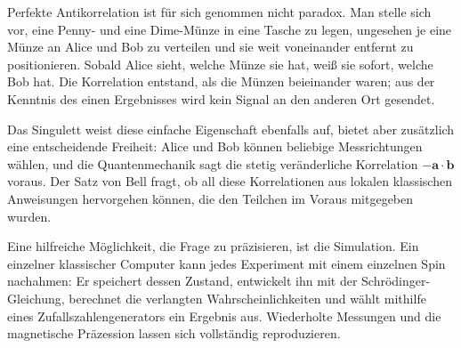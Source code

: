 Perfekte Antikorrelation ist für sich genommen nicht paradox. Man stelle sich vor, eine Penny- und eine Dime-Münze in eine Tasche zu legen, ungesehen je eine Münze an Alice und Bob zu verteilen und sie weit voneinander entfernt zu positionieren. Sobald Alice sieht, welche Münze sie hat, weiß sie sofort, welche Bob hat. Die Korrelation entstand, als die Münzen beieinander waren; aus der Kenntnis des einen Ergebnisses wird kein Signal an den anderen Ort gesendet.

Das Singulett weist diese einfache Eigenschaft ebenfalls auf, bietet aber zusätzlich eine entscheidende Freiheit: Alice und Bob können beliebige Messrichtungen wählen, und die Quantenmechanik sagt die stetig veränderliche Korrelation \(-\bm a\cdot\bm b\) voraus. Der Satz von Bell fragt, ob all diese Korrelationen aus lokalen klassischen Anweisungen hervorgehen können, die den Teilchen im Voraus mitgegeben wurden.

\begin{classroomqa}
\end{classroomqa}

\begin{classroomqa}
\end{classroomqa}

Eine hilfreiche Möglichkeit, die Frage zu präzisieren, ist die Simulation. Ein einzelner klassischer Computer kann jedes Experiment mit einem einzelnen Spin nachahmen: Er speichert dessen Zustand, entwickelt ihn mit der Schr\"odinger-Gleichung, berechnet die verlangten Wahrscheinlichkeiten und wählt mithilfe eines Zufallszahlengenerators ein Ergebnis aus. Wiederholte Messungen und die magnetische Präzession lassen sich vollständig reproduzieren.

